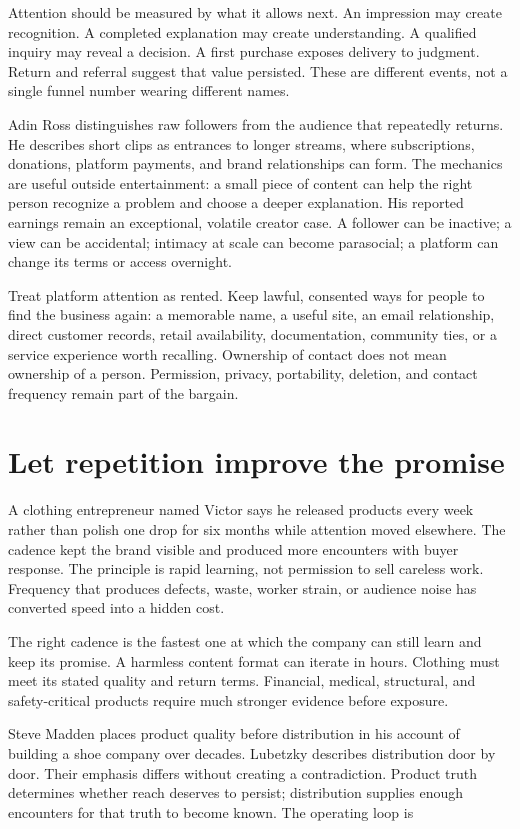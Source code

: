 Attention should be measured by what it allows next. An impression may create
recognition. A completed explanation may create understanding. A qualified
inquiry may reveal a decision. A first purchase exposes delivery to judgment.
Return and referral suggest that value persisted. These are different events,
not a single funnel number wearing different names.

Adin Ross distinguishes raw followers from the audience that repeatedly
returns. He describes short clips as entrances to longer streams, where
subscriptions, donations, platform payments, and brand relationships can form.
The mechanics are useful outside entertainment: a small piece of content can
help the right person recognize a problem and choose a deeper explanation.
His reported earnings remain an exceptional, volatile creator case. A follower
can be inactive; a view can be accidental; intimacy at scale can become
parasocial; a platform can change its terms or access overnight.

Treat platform attention as rented. Keep lawful, consented ways for people to
find the business again: a memorable name, a useful site, an email relationship,
direct customer records, retail availability, documentation, community ties,
or a service experience worth recalling. Ownership of contact does not mean
ownership of a person. Permission, privacy, portability, deletion, and contact
frequency remain part of the bargain.

\section{Let repetition improve the promise}

A clothing entrepreneur named Victor says he released products every week
rather than polish one drop for six months while attention moved elsewhere.
The cadence kept the brand visible and produced more encounters with buyer
response. The principle is rapid learning, not permission to sell careless
work. Frequency that produces defects, waste, worker strain, or audience noise
has converted speed into a hidden cost.

The right cadence is the fastest one at which the company can still learn and
keep its promise. A harmless content format can iterate in hours. Clothing must
meet its stated quality and return terms. Financial, medical, structural, and
safety-critical products require much stronger evidence before exposure.

Steve Madden places product quality before distribution in his account of
building a shoe company over decades. Lubetzky describes distribution door by
door. Their emphasis differs without creating a contradiction. Product truth
determines whether reach deserves to persist; distribution supplies enough
encounters for that truth to become known. The operating loop is

